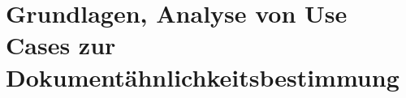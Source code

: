 \chapter{Grundlagen, Analyse von Use Cases zur Dokument\"ahnlichkeitsbestimmung }
\label{chap:Grundlagen}






